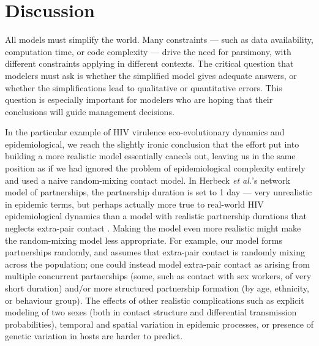 \documentclass[10pt,letterpaper]{article}
\newcommand{\etal}{\textit{et al.}}
\begin{document}
\section*{Discussion}

All models must simplify the world.  Many constraints --- such as data
availability, computation time, or code complexity --- drive the need
for parsimony, with different constraints applying in different
contexts. The critical question that modelers must ask is whether the
simplified model gives adequate answers, or whether the
simplifications lead to qualitative or quantitative errors.
This question is especially important for modelers who
are hoping that their conclusions will guide management decisions.

In the particular example of HIV virulence eco-evolutionary dynamics
and epidemiological, we reach the slightly ironic conclusion that the
effort put into building a more realistic model essentially cancels
out, leaving us in the same position as if we had ignored the problem
of epidemiological complexity entirely and used a naive random-mixing
contact model. In Herbeck \etal's \cite{herbeck_hiv_2014} network model of partnerships, the partnership duration is set to 1 day --- very unrealistic in epidemic terms, but perhaps
actually more true to real-world HIV epidemiological dynamics than a
model with realistic partnership durations that neglects extra-pair
contact \cite{herbeck2016evolution}. Making the model even more realistic
might make the random-mixing model less appropriate. For
example, our model forms partnerships randomly, and assumes that
extra-pair contact is randomly mixing across the population;
one could instead model extra-pair contact as arising from
multiple concurrent partnerships (some, such as contact with sex
workers, of very short duration) and/or more structured partnership
formation (by age, ethnicity, or behaviour group). The effects of
other realistic complications such as explicit modeling of two
sexes (both in contact structure and differential transmission
probabilities), temporal and spatial variation in epidemic processes,
or presence of genetic variation in hosts are harder to predict.
\end{document}
